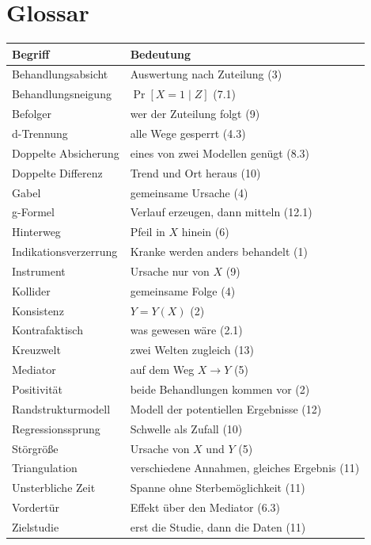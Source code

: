 \section{Glossar}

\begin{merksatz}
\begin{center}
{\small
\renewcommand{\arraystretch}{1.3}
\begin{longtable}{@{}P{3.6cm}P{5.0cm}@{}}
\toprule
\textbf{Begriff} & \textbf{Bedeutung}\\
\midrule
\endhead
Behandlungsabsicht & Auswertung nach Zuteilung (3)\\
Behandlungsneigung & $\Pr[X{=}1\mid Z]$ (7.1)\\
Befolger & wer der Zuteilung folgt (9)\\
d-Trennung & alle Wege gesperrt (4.3)\\
Doppelte Absicherung & eines von zwei Modellen genügt (8.3)\\
Doppelte Differenz & Trend und Ort heraus (10)\\
Gabel & gemeinsame Ursache (4)\\
g-Formel & Verlauf erzeugen, dann mitteln (12.1)\\
Hinterweg & Pfeil in $X$ hinein (6)\\
Indikationsverzerrung & Kranke werden anders behandelt (1)\\
Instrument & Ursache nur von $X$ (9)\\
Kollider & gemeinsame Folge (4)\\
Konsistenz & $Y = Y(X)$ (2)\\
Kontrafaktisch & was gewesen wäre (2.1)\\
Kreuzwelt & zwei Welten zugleich (13)\\
Mediator & auf dem Weg $X \to Y$ (5)\\
Positivität & beide Behandlungen kommen vor (2)\\
Randstrukturmodell & Modell der potentiellen Ergebnisse (12)\\
Regressionssprung & Schwelle als Zufall (10)\\
Störgröße & Ursache von $X$ und $Y$ (5)\\
Triangulation & verschiedene Annahmen, gleiches Ergebnis (11)\\
Unsterbliche Zeit & Spanne ohne Sterbemöglichkeit (11)\\
Vordertür & Effekt über den Mediator (6.3)\\
Zielstudie & erst die Studie, dann die Daten (11)\\
\bottomrule
\end{longtable}}
\end{center}
\end{merksatz}
